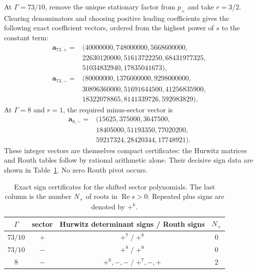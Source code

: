 \documentclass[aps,pra,reprint,superscriptaddress,nofootinbib]{revtex4-2}
\begin{document}
At $\Gamma=73/10$, remove the unique stationary factor from $p_+$ and take
$r=3/2$.  Clearing denominators and choosing positive leading coefficients
gives the following exact coefficient vectors, ordered from the highest power
of $s$ to the constant term:
{\small
\begin{align}
 \mathbf a_{73,+}={}&(40000000,748000000,5668600000,\nonumber\\
 &22630120000,51613722250,68431977325,\nonumber\\
 &51034832940,17835041673),\nonumber\\
 \mathbf a_{73,-}={}&(80000000,1376000000,9298000000,\nonumber\\
 &30896360000,51691644500,41256835900,\nonumber\\
 &18322078865,8141339726,592083829).                                        \label{eq:coeff73}
\end{align}
At $\Gamma=8$ and $r=1$, the required minus-sector vector is
\begin{align}
 \mathbf a_{8,-}={}&(15625,375000,3647500,\nonumber\\
 &18405000,51193350,77020200,\nonumber\\
 &59217324,28420344,17748921).                                               \label{eq:coeff8}
\end{align}
}
These integer vectors are themselves compact certificates: the Hurwitz
matrices and Routh tables follow by rational arithmetic alone.  Their decisive
sign data are shown in Table~\ref{tab:signs}.  No zero Routh pivot occurs.

\begin{table}[!htbp]
\caption{Exact sign certificates for the shifted sector polynomials.  The
last column is the number $N_+$ of roots in $\operatorname{Re}s>0$.
Repeated plus signs are denoted by $+^k$.}
\label{tab:signs}
\begin{ruledtabular}
\begin{tabular}{cccc}
$\Gamma$ & sector & Hurwitz determinant signs / Routh signs & $N_+$\\
\hline
$73/10$ & $+$ & $+^7\;/\;+^8$ & 0\\
$73/10$ & $-$ & $+^8\;/\;+^9$ & 0\\
$8$     & $-$ & $+^6,-,-\;/\;+^7,-,+$ & 2\\
\end{tabular}
\end{ruledtabular}
\end{table}
\end{document}
